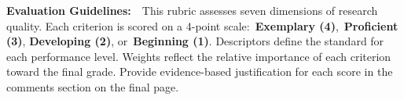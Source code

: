 \documentclass[11pt,a4paper]{article}
\begin{document}
\vspace{10pt}

\begin{tcolorbox}[
  colback=lightaccent,
  colframe=accent!50,
  sharp corners,
  boxrule=0.4pt,
  left=10pt, right=10pt, top=8pt, bottom=8pt,
  before skip=0pt, after skip=0pt
]
  \small\textbf{Evaluation Guidelines:}\ \ This rubric assesses seven dimensions of research quality.
  Each criterion is scored on a 4-point scale:\ \textbf{Exemplary (4)},\ \textbf{Proficient (3)},
  \textbf{Developing (2)}, or\ \textbf{Beginning (1)}. Descriptors define the standard for each
  performance level. Weights reflect the relative importance of each criterion toward the final grade.
  Provide evidence-based justification for each score in the comments section on the final page.
\end{tcolorbox}

\newpage
\end{document}
